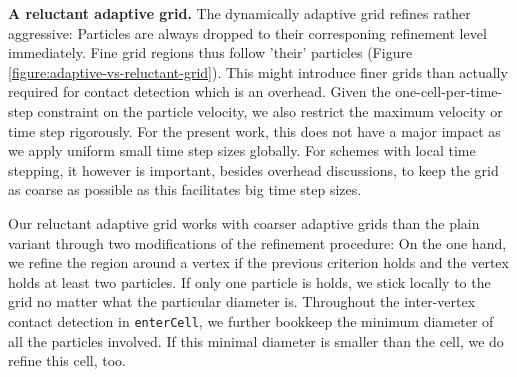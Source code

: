 {\bf A reluctant adaptive grid.}
The dynamically adaptive grid refines rather aggressive: Particles are always
dropped to their corresponing refinement level immediately. 
Fine grid regions thus follow 'their' particles (Figure
\ref{figure:adaptive-vs-reluctant-grid}).
This might introduce finer grids than actually required for contact detection
which is an overhead.
Given the one-cell-per-time-step constraint on the particle velocity, we also
restrict the maximum velocity or time step rigorously.
For the present work, this does not have a major impact as we apply uniform
small time step sizes globally. 
For schemes with local time stepping, it however is important, besides overhead
discussions, to keep the grid as coarse as possible as this facilitates big
time step sizes.

Our reluctant adaptive grid works with coarser adaptive grids than the plain
variant through two modifications of the refinement procedure: 
On the one hand, we refine the region around a vertex if the previous criterion
holds and the vertex holds at least two particles.
If only one particle is holds, we stick locally to the grid no matter what the
particular diameter is.
Throughout the inter-vertex contact detection in \texttt{enterCell}, we further
bookkeep the minimum diameter of all the particles involved. 
If this minimal diameter is smaller than the cell, we do refine this cell, too.

